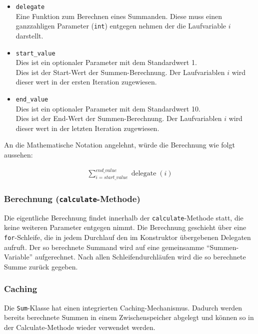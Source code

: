 \documentclass{article}
\DeclareMathOperator{\delegate}{delegate}
\begin{document}
	\begin{itemize}
		\item \verb|delegate| \\ 
			  Eine Funktion zum Berechnen eines Summanden. Diese muss einen ganzzahligen Parameter (\verb|int|) entgegen nehmen der die Laufvariable $i$ darstellt.
		\item \verb|start_value| \\ 
		      Dies ist ein optionaler Parameter mit dem Standardwert 1. \\
		      Dies ist der Start-Wert der Summen-Berechnung. Der Laufvariablen $i$ wird dieser wert in der ersten Iteration zugewiesen.
		\item \verb|end_value| \\
			  Dies ist ein optionaler Parameter mit dem Standardwert 10. \\
			  Dies ist der End-Wert der Summen-Berechnung. Der Laufvariablen $i$ wird dieser wert in der letzten Iteration zugewiesen.
	\end{itemize}
	
	An die Mathematische Notation angelehnt, würde die Berechnung wie folgt aussehen:
	
	\begin{align}
		\sum_{i=start\_value}^{end\_value}\delegate(i)
	\end{align}
	
	\subsubsection{Berechnung (\texttt{calculate}-Methode)}

		Die eigentliche Berechnung findet innerhalb der \verb|calculate|-Methode statt, die keine weiteren Parameter entgegen nimmt. Die Berechnung geschieht über eine \verb|for|-Schleife, die in jedem Durchlauf den im Konstruktor übergebenen Delegaten aufruft. Der so berechnete Summand wird auf eine gemeinsamme "`Summen-Variable"' aufgerechnet. Nach allen Schleifendurchläufen wird die so berechnete Summe zurück gegeben.
	
	\subsubsection{Caching}
	
		Die \verb|Sum|-Klasse hat einen integrierten Caching-Mechanismus. Dadurch werden bereits berechnete Summen in einem Zwischenspeicher abgelegt und können so in der Calculate-Methode wieder verwendet werden. 
		
\end{document}
